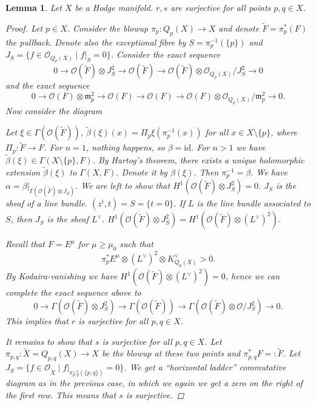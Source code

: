 \documentclass[12pt]{article}
\theoremstyle{darkgreentheorem}
\newtheorem{lm}[thm]{Lemma}
\theoremstyle{darkbluedefinition}
\theoremstyle{darkredexample}
\theoremstyle{remark}
\newcommand{\1}{\mathbbm{1}}
\renewcommand{\O}{\mathcal{O}}
\newcommand{\m}{\mathfrak{m}}
\newcommand{\ot}{\otimes}
\newcommand{\id}{\mathrm{id}}
\newcommand{\dual}{^{\vee}}
\begin{document}
\begin{lm}
    Let $X$ be a Hodge manifold.
    $r,s$ are surjective for all points $p,q\in X$.
    \begin{proof}
	Let $p\in X$.
	Consider the blowup $\pi_{p}\colon Q_{p}(X)\to X$ and denote $\tilde{F}=\pi_{p}^{*}(F)$ the pullback.
	Denote also the exceptional fibre by $S=\pi_{p}^{-1}(\{p\})$ and $J_{S}=\{f\in \O_{Q_{p}(X)}\mid f|_{S}=0\}$.
	Consider the exact sequence
	\[ 0\to \O(\tilde{F})\ot J_{S}^{2}\to \O(\tilde{F})\to \O(\tilde{F})\ot \O_{Q_{p}(X)}/J_{S}^{2}\to 0 \]
	and the exact sequence
	\[ 0\to \O(F)\ot \m_{p}^{2}\to \O(F)\to \O(F)\to \O(F)\ot \O_{Q_{p}(X)}/\m_{p}^{2}\to 0. \]
	Now consider the diagram
	\begin{center}
	\end{center}
	Let $\xi\in \Gamma(\O(\tilde{F}))$, $\tilde{\beta}(\xi)(x)=\Pi_{p}\xi(\pi_{p}^{-1}(x))$ for all $x\in X\setminus \{p\}$, where $\Pi_{p}\colon \tilde{F}\to F$.
	For $n=1$, nothing happens, so $\beta=\id$.
	For $n>1$ we have $\tilde{\beta}(\xi)\in \Gamma(X\setminus \{p\},F)$.
	By Hartog's theorem, there exists a unique holomorphic extension $\tilde{\beta}(\xi)$ to $\Gamma(X,F)$.
	Denote it by $\beta(\xi)$.
	Then $\pi_{p}^{-1}=\beta$.
	We have $\alpha=\beta|_{\Gamma(\O(\tilde{F})\ot J_{S})}$.
	We are left to show that $H^{1}(\O(\tilde{F})\ot J_{S}^{2})=0$.
	$J_{S}$ is the sheaf of a line bundle.
	$(z^{i},t)=S=\{t=0\}$.
	If $L$ is the line bundle associated to $S$, then $J_{S}$ is the sheaf $L\dual$.
	$H^{1}(\O(\tilde{F})\ot J_{S}^{2})=H^{1}(\O(\tilde{F})\ot (L\dual)^{2})$.

	Recall that $F=E^{\mu}$ for $\mu\geqslant \mu_{0}$ such that
	\[ \pi_{p}^{*}E^{\mu}\ot (L\dual)^{2}\ot K_{Q_{p}(X)}\dual >0.\]
	By Kodaira-vanishing we have $H^{1}(\O(\tilde{F})\ot (L\dual)^{2})=0$, hence we can complete the exact sequence above to
	\[ 0\to \Gamma(\O(\tilde{F})\ot J_{S}^{2})\to \Gamma(\O(\tilde{F}))\to \Gamma(\O(\tilde{F})\ot \O/J_{S}^{2}) \to 0.\]
	This implies that $r$ is surjective for all $p,q\in X$.
	
	It remains to show that $s$ is surjective for all $p,q\in X$.
	Let $\pi_{p,q}\colon \tilde{X}=Q_{p,q}(X)\to X$ be the blowup at these two points and $\pi_{p,q}^{*}F=:\tilde{F}$.
	Let $J_{S}=\{f\in \O_{\tilde{X}}\mid f|_{\pi_{p,q}^{-1}(\{p,q\})}=0 \}$.
	We get a ``horizontal ladder'' commutative diagram as in the previous case, in which we again we get a zero on the right of the first row.
	This means that $s$ is surjective.
    \end{proof}
\end{lm}





\end{document}
